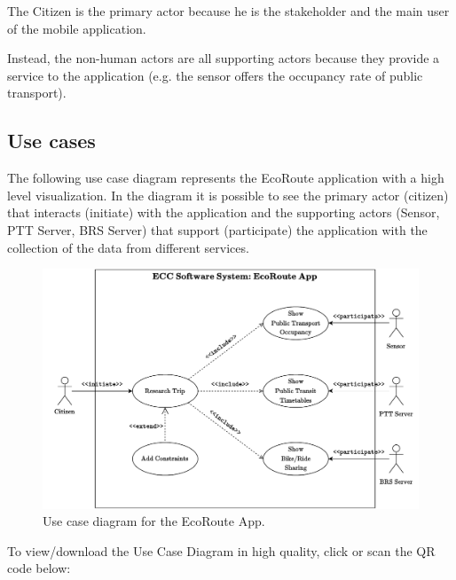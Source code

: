 \documentclass[a4paper]{article}
\newcommand{\highspace}{\vspace{1.2em}\noindent}
\begin{document}
    \highspace
    The Citizen is the primary actor because he is the stakeholder and the main user of the mobile application.

    \highspace
    Instead, the non-human actors are all supporting actors because they provide a service to the application (e.g. the sensor offers the occupancy rate of public transport).

    \newpage

    \subsection{Use cases}

    The following use case diagram represents the EcoRoute application with a high level visualization. In the diagram it is possible to see the primary actor (citizen) that interacts (initiate) with the application and the supporting actors (Sensor, PTT Server, BRS Server) that support (participate) the application with the collection of the data from different services.

    \begin{figure}[!htp]
        \centering
        \includegraphics[width=\textwidth]{img/use-cases.pdf}
        \caption{Use case diagram for the EcoRoute App.}
        \label{fig: use case diagram}
    \end{figure}

    \noindent
    To view/download the Use Case Diagram in high quality, click or scan the QR code below:
    \begin{center}
    \end{center}
\end{document}
